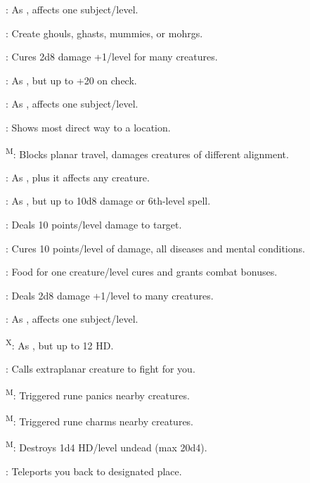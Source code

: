 : As , affects one subject/level.

: Create ghouls, ghasts, mummies, or mohrgs.

: Cures 2d8 damage +1/level for many creatures.

: As , but up to +20 on check.

: As , affects one subject/level.

: Shows most direct way to a location.

\textsuperscript{M}: Blocks planar travel, damages creatures of different alignment.

: As , plus it affects any creature.

: As , but up to 10d8 damage or 6th-level spell.

: Deals 10 points/level damage to target.

: Cures 10 points/level of damage, all diseases and mental conditions.

: Food for one creature/level cures and grants combat bonuses.

: Deals 2d8 damage +1/level to many creatures.

: As , affects one subject/level.

\textsuperscript{X}: As , but up to 12 HD.

: Calls extraplanar creature to fight for you.

\textsuperscript{M}: Triggered rune panics nearby creatures.

\textsuperscript{M}: Triggered rune charms nearby creatures.

\textsuperscript{M}: Destroys 1d4 HD/level undead (max 20d4).


: Teleports you back to designated place.



